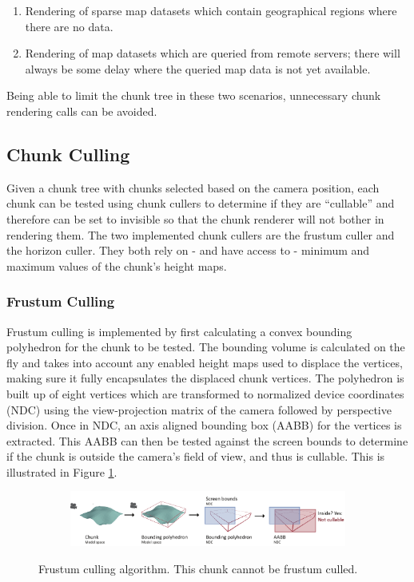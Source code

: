 \begin{enumerate}
\item Rendering of sparse map datasets which contain geographical regions where there are no data.
\item Rendering of map datasets which are queried from remote servers; there will always be some delay where the queried map data is not yet available.
\end{enumerate}

Being able to limit the chunk tree in these two scenarios, unnecessary chunk rendering calls can be avoided.

\subsection{Chunk Culling}
Given a chunk tree with chunks selected based on the camera position, each chunk can be tested using chunk cullers to determine if they are ``cullable'' and therefore can be set to invisible so that the chunk renderer will not bother in rendering them. The two implemented chunk cullers are the frustum culler and the horizon culler. They both rely on - and have access to - minimum and maximum values of the chunk's height maps. 

\subsubsection{Frustum Culling}
Frustum culling is implemented by first calculating a convex bounding polyhedron for the chunk to be tested. The bounding volume is calculated on the fly and takes into account any enabled height maps used to displace the vertices, making sure it fully encapsulates the displaced chunk vertices. The polyhedron is built up of eight vertices which are transformed to normalized device coordinates (NDC) using the view-projection matrix of the camera followed by perspective division. Once in NDC, an axis aligned bounding box (AABB) for the vertices is extracted. This AABB can then be tested against the screen bounds to determine if the chunk is outside the camera's field of view, and thus is cullable. This is illustrated in Figure \ref{fig:frustumculling}.

\begin{figure}[htbp]
    \centering
    \begin{subfigure}[bt]{1.0\textwidth}
        \includegraphics[width=\textwidth]{figures/implementation/chunklod/frustumculling.pdf}
    \end{subfigure}
    \caption{Frustum culling algorithm. This chunk cannot be frustum culled.}
    \label{fig:frustumculling}
\end{figure}

